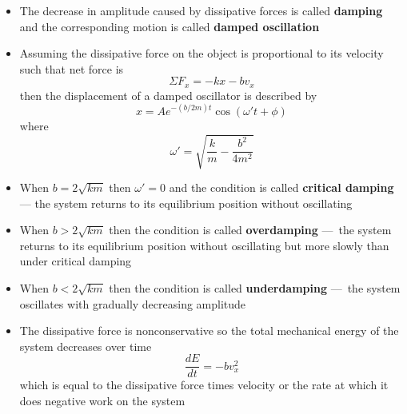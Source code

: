 \documentclass{article}
\begin{document}
\begin{itemize}
    \item The decrease in amplitude caused by dissipative forces is called \textbf{damping} and the corresponding motion is called \textbf{damped oscillation}

    \item Assuming the dissipative force on the object is proportional to its velocity such that net force is \[\Sigma F_x = -kx -bv_x\] then the displacement of a damped oscillator is described by \[x = Ae^{-(b/2m)t}\cos(\omega't + \phi)\] where \[\omega' = \sqrt{\frac{k}{m} - \frac{b^2}{4m^2}}\]

    \item When $b = 2\sqrt{km}$ then $\omega'=0$ and the condition is called \textbf{critical damping} — the system returns to its equilibrium position without oscillating

    \item When $b > 2\sqrt{km}$ then the condition is called \textbf{overdamping} — the system returns to its equilibrium position without oscillating but more slowly than under critical damping

    \item When $b < 2\sqrt{km}$ then the condition is called \textbf{underdamping} — the system oscillates with gradually decreasing amplitude

    \item The dissipative force is nonconservative so the total mechanical energy of the system decreases over time \[\frac{dE}{dt} = -bv_x^2\] which is equal to the dissipative force times velocity or the rate at which it does negative work on the system
\end{itemize}
\end{document}
